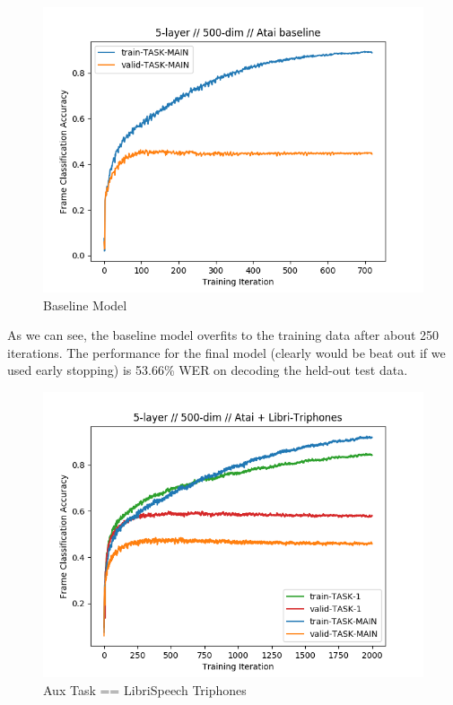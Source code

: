 \documentclass[a4paper]{article}
\begin{document}
\begin{figure}[!htb]
  \centering
{}
  \includegraphics[width=\linewidth]{figs/atai-baseline.png}
  \caption{Baseline Model}
\endminipage\hfill
\end{figure}

As we can see, the baseline model overfits to the training data after about 250 iterations. The performance for the final model (clearly would be beat out if we used early stopping) is 53.66\% WER on decoding the held-out test data.



\begin{figure}[!htb]
  \centering
{}
  \includegraphics[width=\linewidth]{figs/atai-libritriphones.png}
  \caption{Aux Task == LibriSpeech Triphones}
\endminipage\hfill
\end{figure}
\end{document}
